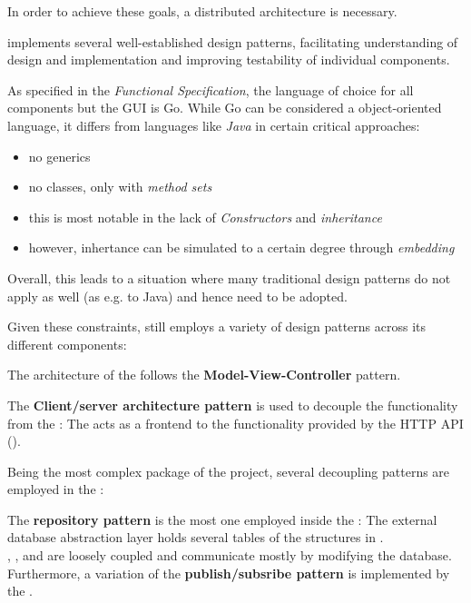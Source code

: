 In order to achieve these goals, a distributed architecture is necessary.

\mamid implements several well-established design patterns, facilitating understanding of design and implementation and improving
testability of individual components.

As specified in the \emph{Functional Specification}, the language of choice for all components but the GUI is Go.
While Go can be considered a object-oriented language, it differs from languages like \emph{Java} in certain critical approaches:
\begin{itemize}
  \item no generics
  \item no classes, only  with \emph{method sets}
  \item this is most notable in the lack of \emph{Constructors} and \emph{inheritance}
  \item however, inhertance can be simulated to a certain degree through \emph{embedding} %
\end{itemize}

Overall, this leads to a situation where many traditional design patterns do not apply as well (as e.g. to Java) and hence need
to be adopted.

Given these constraints, \mamid still employs a variety of design patterns across its different components:

The architecture of the  follows the \textbf{Model-View-Controller} pattern.

The \textbf{Client/server architecture pattern} is used to decouple the  functionality from the :
The  acts as a frontend to the functionality provided by the  HTTP API ().

Being the most complex package of the project, several decoupling patterns are employed in the :

The \textbf{repository pattern} is the most one employed inside the :
The external  database abstraction layer holds several tables of the structures in .\\
,  ,
 and   are loosely coupled and communicate mostly by
modifying the database.\\
Furthermore, a variation of the \textbf{publish/subsribe pattern} is implemented by the .

